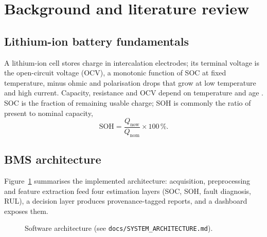 \section{Background and literature review}
\subsection{Lithium-ion battery fundamentals}
A lithium-ion cell stores charge in intercalation electrodes; its terminal voltage is the open-circuit voltage (OCV), a monotonic function of SOC at fixed temperature, minus ohmic and polarisation drops that grow at low temperature and high current. Capacity, resistance and OCV depend on temperature and age \cite{waag2014,hu2020joule}. SOC is the fraction of remaining usable charge; SOH is commonly the ratio of present to nominal capacity,
\begin{equation}
\mathrm{SOH}=\frac{Q_{\mathrm{now}}}{Q_{\mathrm{nom}}}\times 100\,\%.
\end{equation}

\subsection{BMS architecture}
Figure~\ref{fig:arch} summarises the implemented architecture: acquisition, preprocessing and feature extraction feed four estimation layers (SOC, SOH, fault diagnosis, RUL), a decision layer produces provenance-tagged reports, and a dashboard exposes them.
\begin{figure}[H]\centering
{}
\caption{Software architecture (see \texttt{docs/SYSTEM\_ARCHITECTURE.md}).}\label{fig:arch}
\end{figure}

